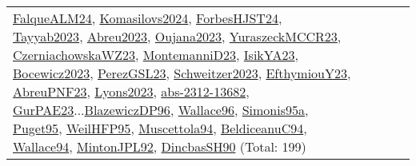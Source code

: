 {\begin{longtable}{p{3cm}r>{\raggedright\arraybackslash}p{6cm}>{\raggedright\arraybackslash}p{6cm}>{\raggedright\arraybackslash}p{8cm}}
\hyperref[detail:FalqueALM24]{FalqueALM24}, \hyperref[detail:Komasilovs2024]{Komasilovs2024}, \hyperref[detail:ForbesHJST24]{ForbesHJST24}, \hyperref[detail:Tayyab2023]{Tayyab2023}, \hyperref[detail:Abreu2023]{Abreu2023}, \hyperref[detail:Oujana2023]{Oujana2023}, \hyperref[detail:YuraszeckMCCR23]{YuraszeckMCCR23}, \hyperref[detail:CzerniachowskaWZ23]{CzerniachowskaWZ23}, \hyperref[detail:MontemanniD23]{MontemanniD23}, \hyperref[detail:IsikYA23]{IsikYA23}, \hyperref[detail:Bocewicz2023]{Bocewicz2023}, \hyperref[detail:PerezGSL23]{PerezGSL23}, \hyperref[detail:Schweitzer2023]{Schweitzer2023}, \hyperref[detail:EfthymiouY23]{EfthymiouY23}, \hyperref[detail:AbreuPNF23]{AbreuPNF23}, \hyperref[detail:Lyons2023]{Lyons2023}, \hyperref[detail:abs-2312-13682]{abs-2312-13682}, \hyperref[detail:GurPAE23]{GurPAE23}...\hyperref[detail:BlazewiczDP96]{BlazewiczDP96}, \hyperref[detail:Wallace96]{Wallace96}, \hyperref[detail:Simonis95a]{Simonis95a}, \hyperref[detail:Puget95]{Puget95}, \hyperref[detail:WeilHFP95]{WeilHFP95}, \hyperref[detail:Muscettola94]{Muscettola94}, \hyperref[detail:BeldiceanuC94]{BeldiceanuC94}, \hyperref[detail:Wallace94]{Wallace94}, \hyperref[detail:MintonJPL92]{MintonJPL92}, \hyperref[detail:DincbasSH90]{DincbasSH90} (Total: 199)\\

\end{longtable}}
